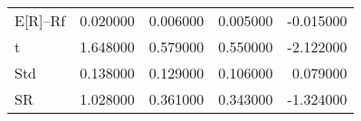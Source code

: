 \begin{tabular}{lrrrr}
\toprule
\midrule
E[R]--Rf & 0.020000 & 0.006000 & 0.005000 & -0.015000 \\
t & 1.648000 & 0.579000 & 0.550000 & -2.122000 \\
Std & 0.138000 & 0.129000 & 0.106000 & 0.079000 \\
SR & 1.028000 & 0.361000 & 0.343000 & -1.324000 \\
\bottomrule
\end{tabular}
